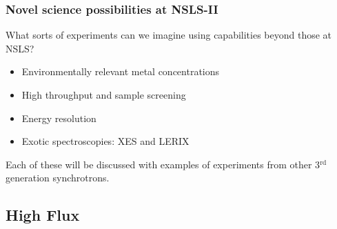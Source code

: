 \documentclass[10pt, xcolor=x11names, compress]{beamer}
\begin{document}
\begin{frame}
  \frametitle{Novel science possibilities at NSLS-II}
  What sorts of experiments can we imagine using capabilities beyond
  those at NSLS?

  \bigskip

  \begin{itemize}
  \item Environmentally relevant metal concentrations
  \item High throughput and sample screening
  \item Energy resolution
  \item Exotic spectroscopies: XES and LERIX
  \end{itemize}

  \bigskip

  Each of these will be discussed with examples of experiments from
  other 3$^{\textrm{rd}}$ generation synchrotrons.
\end{frame}


\subsection[High flux]{High Flux}
\end{document}
